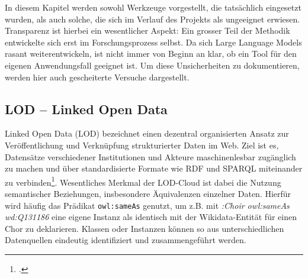\documentclass[12pt, a4paper, ngerman, bidi=default]{article}
\let\cite\footcite
\begin{document}
In diesem Kapitel werden sowohl Werkzeuge vorgestellt, die tatsächlich eingesetzt wurden, als auch solche, die sich 
im Verlauf des Projekts als ungeeignet erwiesen. Transparenz ist hierbei ein wesentlicher Aspekt: Ein grosser Teil der 
Methodik entwickelte sich erst im Forschungsprozess selbst. Da sich Large Language Models rasant weiterentwickeln, 
ist nicht immer von Beginn an klar, ob ein Tool für den eigenen Anwendungsfall geeignet ist.
Um diese Unsicherheiten zu dokumentieren, werden hier auch gescheiterte Versuche dargestellt.

\subsection{LOD – Linked Open Data}\label{subsec:LOD}

Linked Open Data (LOD) bezeichnet einen dezentral organisierten Ansatz zur Veröffentlichung und 
Verknüpfung strukturierter Daten im Web. Ziel ist es, Datensätze verschiedener Institutionen und Akteure 
maschinenlesbar zugänglich zu machen und über standardisierte Formate wie RDF und SPARQL miteinander zu 
verbinden\cite[vgl.][S.~VI und 13f]{garoufallou_metadata_2020}.
Wesentliches Merkmal der LOD-Cloud ist dabei die Nutzung semantischer Beziehungen, insbesondere Äquivalenzen einzelner Daten. 
Hierfür wird häufig das Prädikat \texttt{owl:sameAs} genutzt, um z.B. mit \colorbox{VeryLightGray}{\textit{:Choir owl:sameAs wd:Q131186}} eine eigene 
Instanz als identisch mit der Wikidata-Entität für einen Chor zu deklarieren.
Klassen oder Instanzen können so aus unterschiedlichen Datenquellen eindeutig identifiziert und zusammengeführt werden.
\end{document}
